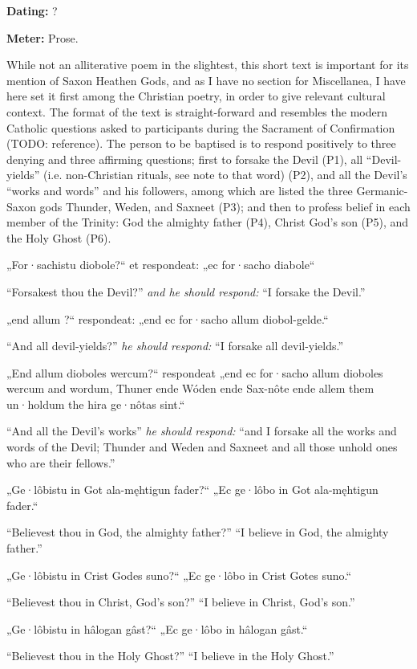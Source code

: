 
\begin{flushright}%
\textbf{Dating: }?

\textbf{Meter: }Prose.
\end{flushright}%

While not an alliterative poem in the slightest, this short text is important for its mention of Saxon Heathen Gods, and as I have no section for Miscellanea, I have here set it first among the Christian poetry, in order to give relevant cultural context.  The format of the text is straight-forward and resembles the modern Catholic questions asked to participants during the Sacrament of Confirmation (TODO: reference).  The person to be baptised is to respond positively to three denying and three affirming questions; first to forsake the Devil (P1), all “Devil-yields” (i.e. non-Christian rituals, see note to that word) (P2), and all the Devil’s “works and words” and his followers, among which are listed the three Germanic-Saxon gods Thunder, Weden, and Saxneet (P3); and then to profess belief in each member of the Trinity: God the almighty father (P4), Christ God’s son (P5), and the Holy Ghost (P6).

\sectionline

\bpg
\bpa „For·sachistu diobole?“ et respondeat: „ec for·sacho diabole“\epa

\bpb “Forsakest thou the Devil?” \emph{and he should respond:} “I forsake the Devil.”\epb\epg


\bpg
\bpa „end allum ?“ respondeat: „end ec for·sacho allum diobol-gelde.“\epa

\bpb “And all devil-yields?” \emph{he should respond:} “I forsake all devil-yields.”\epb\epg


\bpg
\bpa „End allum dioboles wercum?“ respondeat „end ec for·sacho allum dioboles wercum and wordum, Thuner ende Wóden ende Sax-nôte ende allem them un·holdum the hira ge·nôtas sint.“\epa

\bpb “And all the Devil’s works” \emph{he should respond:} “and I forsake all the works and words of the Devil; Thunder and Weden and Saxneet and all those unhold ones who are their fellows.”\epb\epg


\bpg
\bpa „Ge·lôbistu in Got ala-męhtigun fader?“ „Ec ge·lôbo in Got ala-męhtigun fader.“\epa

\bpb “Believest thou in God, the almighty father?” “I believe in God, the almighty father.”\epb\epg


\bpg
\bpa „Ge·lôbistu in Crist Godes suno?“ „Ec ge·lôbo in Crist Gotes suno.“\epa

\bpb “Believest thou in Christ, God’s son?” “I believe in Christ, God’s son.”\epb\epg


\bpg
\bpa „Ge·lôbistu in hâlogan gâst?“ „Ec ge·lôbo in hâlogan gâst.“\epa

\bpb “Believest thou in the Holy Ghost?” “I believe in the Holy Ghost.”\epb\epg

\sectionline
